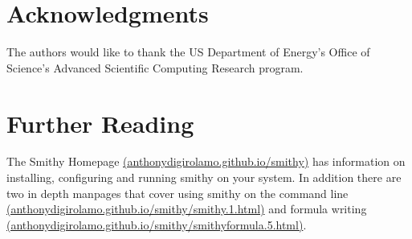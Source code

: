 \documentclass{acm_proc_article-sp}
\begin{document}
\section{Acknowledgments}

The authors would like to thank the US Department of Energy's Office of
Science's Advanced Scientific Computing Research program.

\section{Further Reading}

The Smithy Homepage
\href{http://anthonydigirolamo.github.io/smithy/}{(anthonydigirolamo.github.io/smithy)}
has information on installing, configuring and running smithy on your system. In
addition there are two in depth manpages that cover using smithy on the command
line
\href{http://anthonydigirolamo.github.io/smithy/smithy.1.html}{(anthonydigirolamo.github.io/smithy/smithy.1.html)}
and formula writing
\href{http://anthonydigirolamo.github.io/smithy/smithyformula.5.html}{(anthonydigirolamo.github.io/smithy/smithyformula.5.html)}.







\end{document}
